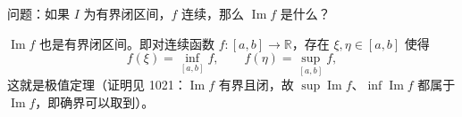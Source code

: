 \documentclass[UTF8,11pt]{ctexart}
\theoremstyle{cnthm}
\begin{document}
问题：如果 $I$ 为有界闭区间，$f$ 连续，那么 $\operatorname{Im}f$ 是什么？

$\operatorname{Im}f$ 也是有界闭区间。即对连续函数 $f:[a,b]\to\mathbb{R}$，存在 $\xi,\eta\in[a,b]$ 使得
\[
f(\xi)=\inf_{[a,b]}f,\qquad f(\eta)=\sup_{[a,b]}f,
\]
这就是极值定理（证明见 1021：$\operatorname{Im}f$ 有界且闭，故 $\sup\operatorname{Im}f$、$\inf\operatorname{Im}f$ 都属于 $\operatorname{Im}f$，即确界可以取到）。
\end{document}
